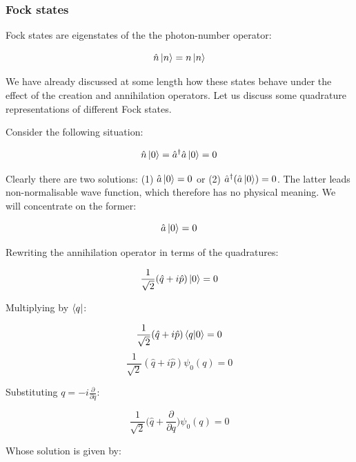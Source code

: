 \documentclass[12pt,a4paper]{report}
\begin{document}
\subsubsection{Fock states}

Fock states are eigenstates of the the photon-number operator:

\begin{equation}
    \hat n \ket{n}=n\ket{n}
\end{equation}

We have already discussed at some length how these states behave under the effect of the creation and annihilation operators. Let us discuss some quadrature representations of different Fock states.

Consider the following situation:

\begin{equation}
    \hat{n}\ket{0}=\hat a^{\dag}\hat a\ket{0}=0
\end{equation}

Clearly there are two solutions: (1) $\hat a\ket{0}=0$ or (2) $\hat{a}^{\dag}(\hat a\ket{0})=0$. The latter leads non-normalisable wave function, which therefore has no physical meaning. We will concentrate on the former:

\begin{equation}
    \hat a \ket{0}=0
\end{equation}

Rewriting the annihilation operator in terms of the quadratures:

\begin{equation*}
    \frac{1}{\sqrt{2}}(\hat q+i\hat p)\ket{0}=0
\end{equation*}

Multiplying by $\bra{q}$:

\begin{equation*}
    \frac{1}{\sqrt{2}}(\hat q+i\hat p)\braket{q}{0}=0
\end{equation*}
\begin{equation*}
    \frac{1}{\sqrt{2}}(\hat q+i\hat p)\psi_0(q)=0
\end{equation*}

Substituting $q=-i\frac{\partial}{\partial q}$:

\begin{equation}
        \frac{1}{\sqrt{2}}\Big(\hat q+\frac{\partial}{\partial q}\Big)\psi_0(q)=0
\end{equation}

Whose solution is given by:
\end{document}
